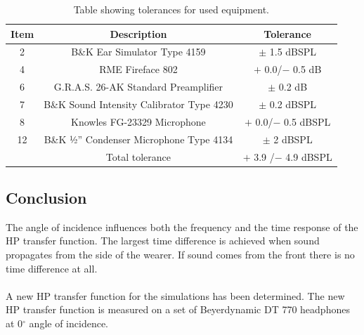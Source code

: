 \begin{table}[H]
	\centering
	\begin{tabular}{ c c c } \toprule
		{Item}	& 		{Description} 	& {Tolerance}	 \\ \bottomrule 
		2	&	B\&K Ear Simulator Type 4159				& $\pm$ 1.5 dBSPL \cite{BK4159Tol} 	\\
		4	& RME Fireface 802								& $+$ 0.0/$-$ 0.5 dB\cite{RME802} \\
		6	&	G.R.A.S. 26-AK Standard Preamplifier		& $\pm$ 0.2 dB \cite{GRAS26}\\
		7	&	B\&K Sound Intensity Calibrator Type 4230	& $\pm$ 0.2 dBSPL\cite{BK4231Tol}	\\
		8	&	Knowles FG-23329 Microphone					& $+$ 0.0/$-$ 0.5 dBSPL	\cite{Knowles}	\\ 
		12	&	B\&K ½'' Condenser Microphone Type 4134 	& $\pm$ 2 dBSPL \cite{bk4134} \\
		 \bottomrule
		&	Total tolerance								& $+$ 3.9 /$-$ 4.9 dBSPL	\\ \bottomrule	
	\end{tabular}
	\caption{Table showing tolerances for used equipment.}
	\label{AngIncTolerances}
\end{table}

\subsection{Conclusion}
The angle of incidence influences both the frequency and the time response of the HP transfer function.  The largest time difference is achieved when sound propagates from the side of the wearer. If sound comes from the front there is no time difference at all. 
\\\\
A new HP transfer function for the simulations has been determined. The new HP transfer function is measured on a set of Beyerdynamic DT 770 headphones at 0$^\circ$ angle of incidence.   